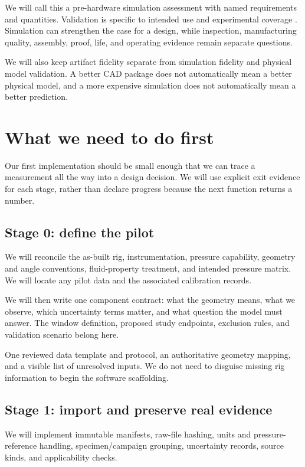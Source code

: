 We will call this a pre-hardware simulation assessment with named requirements and quantities. Validation is specific to intended use and experimental coverage \cite{nasavalidation}. Simulation can strengthen the case for a design, while inspection, manufacturing quality, assembly, proof, life, and operating evidence remain separate questions.

We will also keep artifact fidelity separate from simulation fidelity and physical model validation. A better CAD package does not automatically mean a better physical model, and a more expensive simulation does not automatically mean a better prediction.

\section{What we need to do first}

Our first implementation should be small enough that we can trace a measurement all the way into a design decision. We will use explicit exit evidence for each stage, rather than declare progress because the next function returns a number.

\subsection{Stage 0: define the pilot}

We will reconcile the as-built rig, instrumentation, pressure capability, geometry and angle conventions, fluid-property treatment, and intended pressure matrix. We will locate any pilot data and the associated calibration records.

We will then write one component contract: what the geometry means, what we observe, which uncertainty terms matter, and what question the model must answer. The window definition, proposed study endpoints, exclusion rules, and validation scenario belong here.

One reviewed data template and protocol, an authoritative geometry mapping, and a visible list of unresolved inputs. We do not need to disguise missing rig information to begin the software scaffolding.

\subsection{Stage 1: import and preserve real evidence}

We will implement immutable manifests, raw-file hashing, units and pressure-reference handling, specimen/campaign grouping, uncertainty records, source kinds, and applicability checks.

